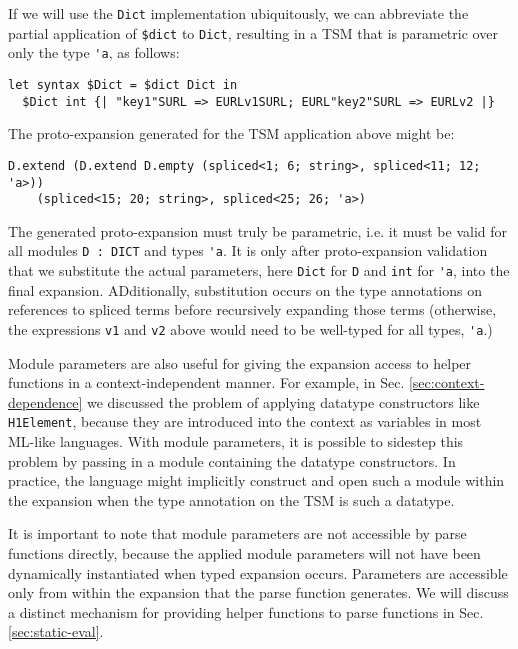 \documentclass[acmlarge,review,anonymous]{acmart}\settopmatter{printfolios=true}
\newcommand{\li}[1]{\lstinline{#1}}
\begin{document}
If we will use the \li{Dict} implementation ubiquitously, we can abbreviate the partial application of \li{$dict} to \li{Dict}, resulting in a TSM that is parametric over only the type \li{'a}, as follows:
\begin{lstlisting}[numbers=none]
  let syntax $Dict = $dict Dict in 
  $Dict int {| "key1"SURL => EURLv1SURL; EURL"key2"SURL => EURLv2 |}
\end{lstlisting}
The proto-expansion generated for the TSM application above might be:
\begin{lstlisting}[numbers=none]
  D.extend (D.extend D.empty (spliced<1; 6; string>, spliced<11; 12; 'a>)) 
    (spliced<15; 20; string>, spliced<25; 26; 'a>)
\end{lstlisting}
The generated proto-expansion must truly be parametric, i.e. it must be valid for all modules \li{D : DICT} and types \li{'a}. It is only after proto-expansion validation that we substitute the actual parameters, here \li{Dict} for \li{D} and \li{int} for \li{'a}, into the final expansion. ADditionally, substitution occurs on the type annotations on references to spliced terms before recursively expanding those terms (otherwise, the expressions \li{v1} and \li{v2} above would need to be well-typed for all types, \li{'a}.)

Module parameters are also useful for giving the expansion access to helper functions in a context-independent manner. For example, in Sec. \ref{sec:context-dependence} we discussed the problem of applying datatype constructors like \li{H1Element}, because they are introduced into the context as variables in most ML-like languages. With module parameters, it is possible to sidestep this problem by passing in a module containing the datatype constructors. In practice, the language might implicitly construct and open such a module within the expansion when the type annotation on the TSM is such a datatype. 

It is important to note that module parameters are not accessible by parse functions directly, because the applied module parameters will not have been dynamically instantiated when typed expansion occurs. Parameters are accessible only from within the expansion that the parse function generates. We will discuss a distinct mechanism for providing helper functions to parse functions in Sec. \ref{sec:static-eval}. 
\end{document}
